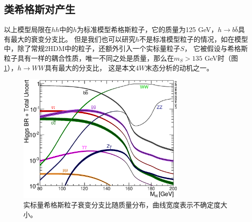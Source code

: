 \subsection{类希格斯对产生}
以上模型局限在$hh$中的$h$为标准模型希格斯粒子，它的质量为125 GeV，$h\rightarrow b\bar{b}$具有最大的衰变分支比。
但是我们也可以研究$h$不是标准模型粒子的情况，如在模型\cite{ExoticHiggsTheory}中，除了常规2HDM中的粒子，还额外引入一个实标量粒子$S$，
它被假设与希格斯粒子具有一样的耦合性质，唯一不同之处是质量，那么在$m_S>135$ GeV时（图\ref{fig:SM-HIGGS-BR}），$h\rightarrow WW$具有最大的分支比，
这是本文4$W$末态分析的动机之一。
\begin{figure}
\centering
 \includegraphics[width=0.75\textwidth]{fig/Higgs_BR_LM_RECT.eps}
 \caption{实标量希格斯粒子衰变分支比随质量分布，曲线宽度表示不确定度大小。\cite{SM-HIGGS-BR}}
 \label{fig:SM-HIGGS-BR}
\end{figure}
%
